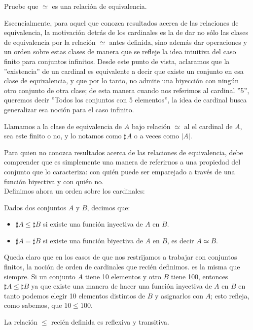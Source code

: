 \documentclass[12pt,a4paper]{book}
\begin{document}
\begin{ej}
Pruebe que $\simeq$ es una relación de equivalencia.
\end{ej}
Escencialmente, para aquel que conozca resultados acerca de las relaciones de equivalencia, la motivación detrás de los cardinales es la de dar no sólo las clases de equivalencia por la relación $\simeq$ antes definida, sino además dar operaciones y un orden sobre estas clases de manera que se refleje la idea intuitiva del caso finito para conjuntos infinitos. Desde este punto de vista, aclaramos que la ''existencia'' de un cardinal es equivalente a decir que existe un conjunto en esa clase de equivalencia, y que por lo tanto, no admite una biyección con ningún otro conjunto de otra clase; de esta manera cuando nos referimos al cardinal ''5'', queremos decir ''Todos los conjuntos con 5 elementos'', la idea de cardinal busca generalizar esa noción para el caso infinito. 
\begin{defi}
Llamamos a la clase de equivalencia de $A$ bajo relación $\simeq$ al el cardinal de $A$, sea este finito o no, y lo notamos como $\sharp A$ o a veces como $|A|$. 
\end{defi}
Para quien no conozca resultados acerca de las relaciones de equivalencia, debe comprender que es simplemente una manera de referirnos a una propiedad del conjunto que lo caracteriza: con quién puede ser emparejado a través de una función biyectiva y con quién no.\\[0.5cm]
Definimos ahora un orden sobre los cardinales:
\begin{defi}
Dados dos conjuntos $A$ y $B$, decimos que:
\begin{itemize}
\item $\sharp A \leq \sharp B$ si existe una función inyectiva de $A$ en $B$.
\item $\sharp A = \sharp B$ si existe una función biyectiva de $A$ en $B$, es decir $A \simeq B$.
\end{itemize}
\end{defi}
Queda claro que en los casos de que nos restrijamos a trabajar con conjuntos finitos, la noción de orden de cardinales que recién definimos. es la misma que siempre. Si un conjunto $A$ tiene 10 elementos y otro $B$ tiene 100, entonces $\sharp A \leq \sharp B$ ya que existe una manera de hacer una función inyectiva de $A$ en $B$ en tanto podemos elegir 10 elementos distintos de $B$ y asignarlos con $A$; esto refleja, como sabemos, que $10 \leq 100$.
\begin{ej} La relación $\leq$ recién definida es reflexiva y transitiva.\end{ej}
\end{document}
